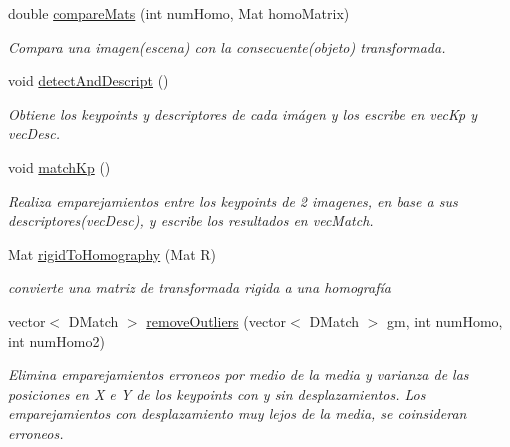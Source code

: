 \begin{DoxyCompactItemize}
double \mbox{\hyperlink{classuav_1_1Stitcher_a0745fd6db5669c1f9bce1b637c2be163}{compare\+Mats}} (int num\+Homo, Mat homo\+Matrix)
\begin{DoxyCompactList}\small\item\em Compara una imagen(escena) con la consecuente(objeto) transformada. \end{DoxyCompactList}\item 
\mbox{\label{classuav_1_1Stitcher_aa2e06db82b2e702285a1cc335aef9bfe}} 
void \mbox{\hyperlink{classuav_1_1Stitcher_aa2e06db82b2e702285a1cc335aef9bfe}{detect\+And\+Descript}} ()
\begin{DoxyCompactList}\small\item\em Obtiene los keypoints y descriptores de cada imágen y los escribe en vec\+Kp y vec\+Desc. \end{DoxyCompactList}\item 
\mbox{\label{classuav_1_1Stitcher_a4f2f80e5505962c031d2b788c621c8fd}} 
void \mbox{\hyperlink{classuav_1_1Stitcher_a4f2f80e5505962c031d2b788c621c8fd}{match\+Kp}} ()
\begin{DoxyCompactList}\small\item\em Realiza emparejamientos entre los keypoints de 2 imagenes, en base a sus descriptores(vec\+Desc), y escribe los resultados en vec\+Match. \end{DoxyCompactList}\item 
\mbox{\label{classuav_1_1Stitcher_a1d9236693b18d722cb5329c5edc29ea9}} 
Mat \mbox{\hyperlink{classuav_1_1Stitcher_a1d9236693b18d722cb5329c5edc29ea9}{rigid\+To\+Homography}} (Mat R)
\begin{DoxyCompactList}\small\item\em convierte una matriz de transformada rigida a una homografía \end{DoxyCompactList}\item 
\mbox{\label{classuav_1_1Stitcher_a1dfaf5c6e14e6234bfca0d8997bc0fc5}} 
vector$<$ D\+Match $>$ \mbox{\hyperlink{classuav_1_1Stitcher_a1dfaf5c6e14e6234bfca0d8997bc0fc5}{remove\+Outliers}} (vector$<$ D\+Match $>$ gm, int num\+Homo, int num\+Homo2)
\begin{DoxyCompactList}\small\item\em Elimina emparejamientos erroneos por medio de la media y varianza de las posiciones en X e Y de los keypoints con y sin desplazamientos. Los emparejamientos con desplazamiento muy lejos de la media, se coinsideran erroneos. \end{DoxyCompactList}\item 

\end{DoxyCompactItemize}
